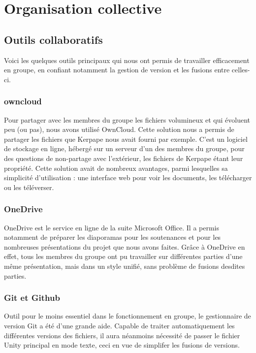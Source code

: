 \section{Organisation collective}

\subsection{Outils collaboratifs}

Voici les quelques outils principaux qui nous ont permis de travailler efficacement en groupe, en confiant notamment la gestion de version et les fusions entre celles-ci.

\subsubsection{owncloud}

Pour partager avec les membres du groupe les fichiers volumineux et qui évoluent peu (ou pas), nous avons utilisé OwnCloud.
Cette solution nous a permis de partager les fichiers que Kerpape nous avait fourni par exemple. 
C'est un logiciel de stockage en ligne, hébergé sur un serveur d'un des membres du groupe, pour des questions de non-partage avec l'extérieur, les fichiers de Kerpape étant leur propriété.
Cette solution avait de nombreux avantages, parmi lesquelles sa simplicité d'utilisation : une interface web pour voir les documents, les télécharger ou les téléverser.

\subsubsection{OneDrive}

OneDrive est le service en ligne de la suite Microsoft Office.
Il a permis notamment de préparer les diaporamas pour les soutenances et pour les nombreuses présentations du projet que nous avons faites.
Grâce à OneDrive en effet, tous les membres du groupe ont pu travailler sur différentes parties d'une même présentation, mais dans un style unifié, sans problème de fusions desdites parties.

\subsubsection{Git et Github}

Outil pour le moins essentiel dans le fonctionnement en groupe, le gestionnaire de version Git a été d'une grande aide.
Capable de traiter automatiquement les différentes versions des fichiers, il aura néanmoins nécessité de passer le fichier Unity principal en mode texte, ceci en vue de simplifer les fusions de versions.

